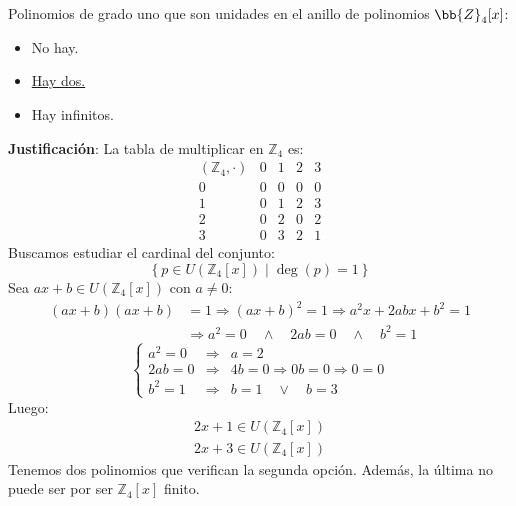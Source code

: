 \begin{ejercicio}
    Polinomios de grado uno que son unidades en el anillo de polinomios $\bb{Z}_4[x]$:
    \begin{itemize}
        \item No hay.
        \item \underline{Hay dos.}
        \item Hay infinitos.
    \end{itemize}

    \noindent
    \textbf{Justificación}:
    La tabla de multiplicar en $\mathbb{Z}_4$ es:
    \begin{equation*}
       \begin{array}{c|cccc}
           (\mathbb{Z}_4, \cdot) & 0 & 1 & 2 & 3 \\
           \hline
           0 & 0 & 0 & 0 & 0 \\
           1 & 0 & 1 & 2 & 3 \\
           2 & 0 & 2 & 0 & 2 \\
           3 & 0 & 3 & 2 & 1
       \end{array} 
    \end{equation*}
    Buscamos estudiar el cardinal del conjunto:
    \begin{equation*}
        \left\{p \in U(\mathbb{Z}_4[x]) \mid \deg(p) =1\right\}
    \end{equation*}
    Sea $ax+b \in U(\mathbb{Z}_4[x])$ con $a\neq 0$:
    \begin{align*}
        (ax+b)(ax+b) &= 1 \Longrightarrow {(ax+b)}^{2}=1 \Longrightarrow a^2x + 2abx + b^2 = 1 \\
                     &\Longrightarrow a^2 = 0 \quad\land\quad 2ab = 0 \quad\land\quad b^2 = 1
    \end{align*}
    \begin{equation*}
        \left\{\begin{array}{lll}
                a^2 = 0 & \Longrightarrow & a = 2 \\
                2ab = 0 & \Longrightarrow & 4b = 0 \Longrightarrow 0b = 0 \Longrightarrow 0=0 \\
                b^2 = 1 & \Longrightarrow & b = 1 \quad\lor\quad b = 3
        \end{array}\right.
    \end{equation*}
    Luego:
    \begin{gather*}
        2x+1 \in U(\mathbb{Z}_4[x]) \\
        2x+3 \in U(\mathbb{Z}_4[x])
    \end{gather*}
    Tenemos dos polinomios que verifican la segunda opción. Además, la última no puede ser por ser $\mathbb{Z}_4[x]$ finito.
\end{ejercicio}

